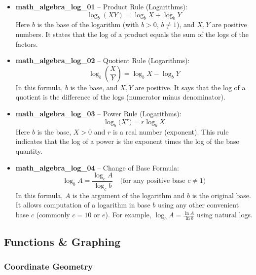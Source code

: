 \documentclass[11pt,a4paper]{article}
\begin{document}
\begin{itemize}
\item \textbf{math\_algebra\_log\_01} -- Product Rule (Logarithms): 
\[\log_b (XY) = \log_b X + \log_b Y\]
Here $b$ is the base of the logarithm (with $b>0$, $b\neq 1$), and $X, Y$ are positive numbers. It states that the log of a product equals the sum of the logs of the factors.

\item \textbf{math\_algebra\_log\_02} -- Quotient Rule (Logarithms): 
\[\log_b \left(\frac{X}{Y}\right) = \log_b X - \log_b Y\]
In this formula, $b$ is the base, and $X, Y$ are positive. It says that the log of a quotient is the difference of the logs (numerator minus denominator).

\item \textbf{math\_algebra\_log\_03} -- Power Rule (Logarithms): 
\[\log_b \big(X^r\big) = r \log_b X\]
Here $b$ is the base, $X>0$ and $r$ is a real number (exponent). This rule indicates that the log of a power is the exponent times the log of the base quantity.

\item \textbf{math\_algebra\_log\_04} -- Change of Base Formula: 
\[\log_{b} A = \frac{\log_{c} A}{\log_{c} b} \quad \text{(for any positive base } c \neq 1\text{)}\]
In this formula, $A$ is the argument of the logarithm and $b$ is the original base. It allows computation of a logarithm in base $b$ using any other convenient base $c$ (commonly $c = 10$ or $e$). For example, $\log_{b}A = \frac{\ln A}{\ln b}$ using natural logs.
\end{itemize}

\subsection{Functions \& Graphing}

\subsubsection{Coordinate Geometry}
\end{document}
